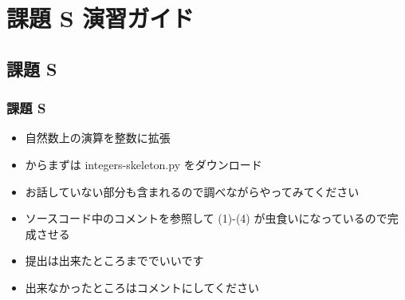 %
%
\section{課題 S 演習ガイド}
\subsection{課題 S}
\begin{frame}[containsverbatim, shrink, label=quizS]
\frametitle{課題 S}
  \begin{itemize}
\item 自然数上の演算を整数に拡張
\item \href{https://sites.google.com/presystems.xyz/elementarycs/top}{} からまずは integers-skeleton.py をダウンロード
\item お話していない部分も含まれるので調べながらやってみてください
\item ソースコード中のコメントを参照して (1)-(4) が虫食いになっているので完成させる
\item 提出は出来たところまででいいです
\item 出来なかったところはコメントにしてください
  \end{itemize}
\end{frame}
